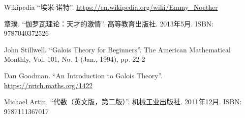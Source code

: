 \documentclass{article}
\begin{document}
\begin{thebibliography}{99}
Wikipedia ``埃米$\cdot$诺特''. \url{https://en.wikipedia.org/wiki/Emmy_Noether}

章璞. ``伽罗瓦理论：天才的激情''. 高等教育出版社. 2013年5月. ISBN: 9787040372526

John Stillwell. ``Galois Theory for Beginners''. The American Mathematical Monthly, Vol. 101, No. 1 (Jan., 1994), pp. 22-2

Dan Goodman. ``An Introduction to Galois Theory''. \url{https://nrich.maths.org/1422}

Michael Artin. ``代数（英文版，第二版）''. 机械工业出版社. 2011年12月. ISBN: 9787111367017

\end{thebibliography}

\expandafter\enddocument

\fi
\end{document}
